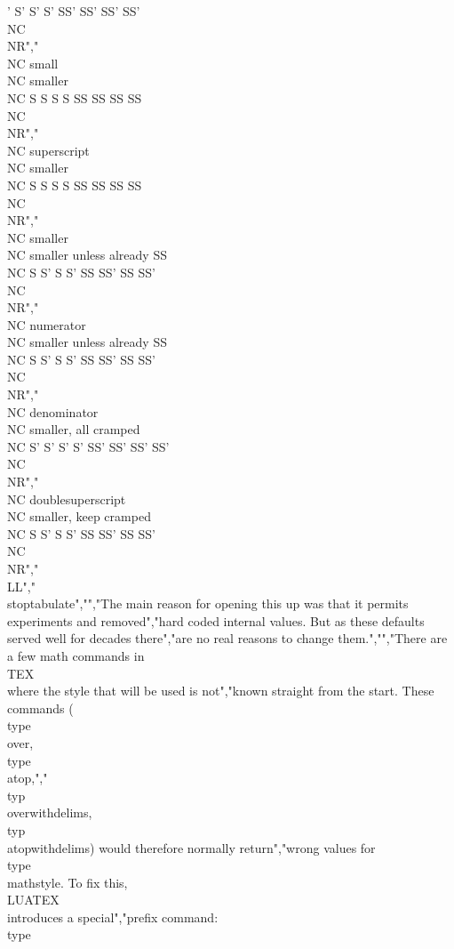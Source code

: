 ' S' S' S' SS' SS' SS' SS' \\NC \\NR","\\NC small             \\NC smaller                   \\NC S  S  S  S  SS  SS  SS  SS  \\NC \\NR","\\NC superscript       \\NC smaller                   \\NC S  S  S  S  SS  SS  SS  SS  \\NC \\NR","\\NC smaller           \\NC smaller unless already SS \\NC S  S' S  S' SS  SS' SS  SS' \\NC \\NR","\\NC numerator         \\NC smaller unless already SS \\NC S  S' S  S' SS  SS' SS  SS' \\NC \\NR","\\NC denominator       \\NC smaller, all cramped      \\NC S' S' S' S' SS' SS' SS' SS' \\NC \\NR","\\NC doublesuperscript \\NC smaller, keep cramped     \\NC S  S' S  S' SS  SS' SS  SS' \\NC \\NR","\\LL","\\stoptabulate","","The main reason for opening this up was that it permits experiments and removed","hard coded internal values. But as these defaults served well for decades there","are no real reasons to change them.","","There are a few math commands in \\TEX\\ where the style that will be used is not","known straight from the start. These commands (\\type {\\over}, \\type {\\atop},","\\typ {\\overwithdelims}, \\typ {\\atopwithdelims}) would therefore normally return","wrong values for \\type {\\mathstyle}. To fix this, \\LUATEX\\ introduces a special","prefix command: \\type 